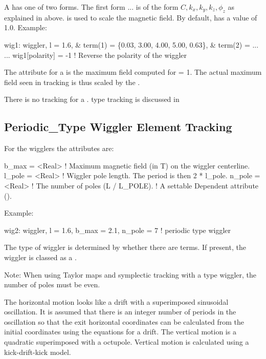 {A  has one of two forms. The first form ... is of the form $C, k_x, k_y, k_z, \phi_z$ as
explained in above.  is used to scale the
magnetic field. By default,  has a value of 1.0. 
Example:
\begin{example}
  wig1: wiggler, l = 1.6, \&
          term(1) = \{0.03, 3.00, 4.00, 5.00, 0.63\}, \&
          term(2) = ...
  ...
  wig1[polarity] = -1  ! Reverse the polarity of the wiggler
\end{example}

The  attribute for a   is the
maximum field computed for  = 1. The actual maximum field
seen in tracking is thus scaled by the .

There is no  tracking for a 
.  type tracking is discussed in 

\subsection{Periodic\_Type Wiggler Element Tracking}
\label{s:wiggler.periodic}

For the  wigglers the attributes are: 
\begin{example}  
  b_max    = <Real>  ! Maximum magnetic field (in T) on the wiggler centerline. 
  l_pole   = <Real>  ! Wiggler pole length. The period is then 2 * l_pole.
  n_pole   = <Real>  ! The number of poles (L / L_POLE). 
                     !   A settable Dependent attribute ().
\end{example}

Example:
\begin{example}
  wig2: wiggler, l = 1.6, b_max = 2.1, n_pole = 7  ! periodic type wiggler
\end{example}

The type of wiggler is determined by whether there are 
terms. If present, the wiggler is classed as a .

Note: When using Taylor maps and symplectic tracking with a
 type wiggler, the number of poles must be even.

The horizontal motion looks like a drift with a superimposed
sinusoidal oscillation. It is assumed that there is an integer number
of periods in the oscillation so that the exit horizontal coordinates
can be calculated from the initial coordinates using the equations for
a drift. The vertical motion is a quadratic superimposed with a
octupole. Vertical motion is calculated using a kick-drift-kick model.

}
